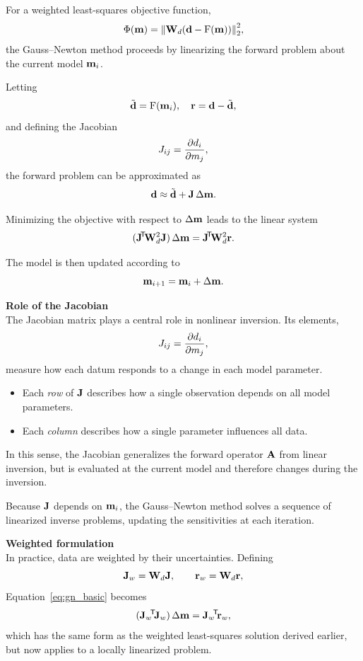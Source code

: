 For a weighted least-squares objective function,
\[
    \Phi(\vb{m}) = \norm{\vb{W}_d (\vb{d} - \operatorname{F}(\vb{m}))}_2^2,
\]
the Gauss--Newton method proceeds by linearizing the forward problem about the current model $\vb{m}_i$.

Letting
\[
    \tilde{\vb{d}} = \operatorname{F}(\vb{m}_i), \quad
    \vb{r} = \vb{d} - \tilde{\vb{d}},
\]
and defining the Jacobian
\[
    J_{ij} = \pdv{d_i}{m_j},
\]
the forward problem can be approximated as
\[
    \vb{d} \approx \tilde{\vb{d}} + \vb{J} \, \Delta \vb{m}.
\]

Minimizing the objective with respect to $\Delta \vb{m}$ leads to the linear system
\begin{equation}
    (\vb{J}\!^\mathsf{T}\! \vb{W}_d^2 \vb{J}) \, \Delta \vb{m}
    = \vb{J}\!^\mathsf{T}\! \vb{W}_d^2 \vb{r}.
    \label{eq:gn_basic}
\end{equation}

The model is then updated according to
\[
    \vb{m}_{i+1} = \vb{m}_i + \Delta \vb{m}.
\]

\medskip
\noindent\textbf{Role of the Jacobian} \\

The Jacobian matrix plays a central role in nonlinear inversion. Its elements,
\[
    J_{ij} = \pdv{d_i}{m_j},
\]
measure how each datum responds to a change in each model parameter.

\begin{itemize}
    \item Each \emph{row} of $\vb{J}$ describes how a single observation depends on all model parameters.
    \item Each \emph{column} describes how a single parameter influences all data.
\end{itemize}

In this sense, the Jacobian generalizes the forward operator $\vb{A}$ from linear inversion, but is evaluated at the current model and therefore changes during the inversion.

Because $\vb{J}$ depends on $\vb{m}_i$, the Gauss--Newton method solves a sequence of linearized inverse problems, updating the sensitivities at each iteration.

\medskip
\noindent\textbf{Weighted formulation} \\

In practice, data are weighted by their uncertainties. Defining
\[
    \vb{J}_w = \vb{W}_d \vb{J}, \qquad
    \vb{r}_w = \vb{W}_d \vb{r},
\]
Equation~\ref{eq:gn_basic} becomes
\[
    (\vb{J}_w\!^\mathsf{T}\! \vb{J}_w) \, \Delta \vb{m}
    = \vb{J}_w\!^\mathsf{T}\! \vb{r}_w,
\]
which has the same form as the weighted least-squares solution derived earlier, but now applies to a locally linearized problem.

